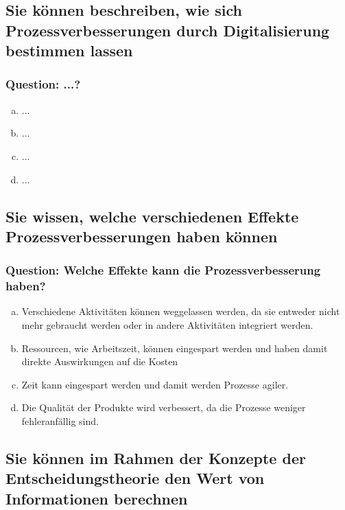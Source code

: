 \documentclass{article}
\begin{document}
\begin{adjustwidth}{2em}{2em}
\begin{adjustwidth}{2em}{2em}
			\subsection{Sie können beschreiben, wie sich Prozessverbesserungen durch Digitalisierung bestimmen lassen}
			\begin{adjustwidth}{1em}{}
				\subsubsection*{Question: ...?}
				\begin{adjustwidth}{1em}{}
					\begin{enumerate}[(a)]
						\item ...
						\item ...
						\item ...
						\item ...
					\end{enumerate}
				\end{adjustwidth}
			\end{adjustwidth}
			\subsection{Sie wissen, welche verschiedenen Effekte Prozessverbesserungen haben können}
			\begin{adjustwidth}{1em}{}
				\subsubsection*{Question: Welche Effekte kann die Prozessverbesserung haben?}
				\begin{adjustwidth}{1em}{}
					\begin{enumerate}[(a)]
						\item Verschiedene Aktivitäten können weggelassen werden, da sie entweder nicht mehr gebraucht werden oder in andere Aktivitäten integriert werden.
						\item Ressourcen, wie Arbeitszeit, können eingespart werden und haben damit direkte Auswirkungen auf die Kosten
						\item Zeit kann eingespart werden und damit werden Prozesse agiler.
						\item Die Qualität der Produkte wird verbessert, da die Prozesse weniger fehleranfällig sind.
					\end{enumerate}
				\end{adjustwidth}
			\end{adjustwidth}
			\subsection{Sie können im Rahmen der Konzepte der Entscheidungstheorie den Wert von Informationen berechnen}
			\begin{adjustwidth}{1em}{}

\end{adjustwidth}
\end{adjustwidth}
\end{adjustwidth}
\end{document}
